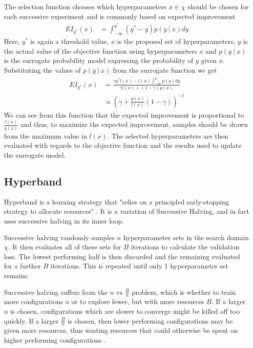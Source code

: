 The selection function chooses which hyperparameters $x \in \chi$ should be chosen for each successive experiment and is commonly based on expected improvement \cite{bayesiantds}
\begin{align}
	EI_{y^*}(x) &= \int_{-\infty}^{y^*} (y^* - y) p(y~|~x)dy
\end{align}
Here, $y^*$ is again a threshold value, $x$ is the proposed set of hyperparameters, $y$ is the actual value of the objective function using hyperparameters $x$ and $p(y~|~x)$ is the surrogate probability model expressing the probability of $y$ given $x$.
Substituting the values of $p(y~|~x)$ from the surrogate function we get
\begin{align}
	EI_{y^*}(x) &= \frac{\gamma y^* l(x) - l(x) \int_{-\infty}^{y^*}p(y)dy}{\gamma l(x) + (1 - \gamma)g(x)}\\
	&\propto \left(\gamma + \frac{g(x)}{l(x)} (1 - \gamma)\right)^{-1}
\end{align}
We can see from this function that the expected improvement is proportional to $\frac{l(x)}{g(x)}$ and thus, to maximize the expected improvement, samples should be drawn from the maximum value in $l(x)$.
The selected hyperparameters are then evaluated with regards to the objective function and the results used to update the surrogate model.

\subsection{Hyperband}\label{section:background-hyperband}
Hyperband is a learning strategy that "relies on a principled early-stopping strategy to allocate resources" \cite{hyperband}. 
It is a variation of Successive Halving, and in fact uses successive halving in its inner loop.

Successive halving randomly samples $n$ hyperparameter sets in the search domain $\chi$.
It then evaluates all of these sets for $B$ iterations to calculate the validation loss.
The lowest performing half is then discarded and the remaining evaluated for a further $B$ iterations.
This is repeated until only 1 hyperparameter set remains.

Successive halving suffers from the $n \text{ vs } \frac{B}{n}$ problem, which is whether to train more configurations $n$ or to explore fewer, but with more resources $B$.
If a larger $n$ is chosen, configurations which are slower to converge might be killed off too quickly.
If a larger $\frac{B}{n}$ is chosen, then lower performing configurations may be given more resources, thus wasting resources that could otherwise be spent on higher performing configurations \cite{hyperband}.


